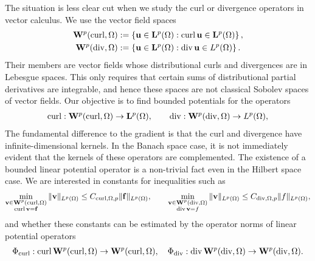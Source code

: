 \documentclass[12pt,a4paper]{article}
\begin{document}
The situation is less clear cut when we study the curl or divergence operators in vector calculus.
We use the vector field spaces
\begin{align*}
    {\mathbf W}^{p}(\operatorname{curl},\Omega) &:= \left\{ {\mathbf u} \in {\mathbf L}^p(\Omega) : \operatorname{curl} {\mathbf u} \in {\mathbf L}^p(\Omega) \right\}
    ,
    \\
    {\mathbf W}^{p}(\operatorname{div},\Omega) &:= \left\{ {\mathbf u} \in {\mathbf L}^p(\Omega) : \operatorname{div} {\mathbf u} \in L^p(\Omega) \right\}
    .
\end{align*}
Their members are vector fields whose distributional curls and divergences are in Lebesgue spaces. 
This only requires that certain sums of distributional partial derivatives are integrable, 
and hence these spaces are not classical Sobolev spaces of vector fields. 
Our objective is to find bounded potentials for the operators 
\begin{align*}
    \operatorname{curl} : {\mathbf W}^{p}(\operatorname{curl},\Omega) \rightarrow {\mathbf L}^{p}(\Omega),
    \qquad 
    \operatorname{div} : {\mathbf W}^{p}(\operatorname{div},\Omega) \rightarrow L^{p}(\Omega),
\end{align*}
The fundamental difference to the gradient is that the curl and divergence have infinite-dimensional kernels. 
In the Banach space case, it is not immediately evident that the kernels of these operators are complemented.
The existence of a bounded linear potential operator is a non-trivial fact even in the Hilbert space case.
We are interested in constants for inequalities such as 
\begin{align*}
    \min\limits_{ \substack{ {\mathbf v} \in {\mathbf W}^{p}(\operatorname{curl},\Omega) \\ \operatorname{curl} {\mathbf v} = {\mathbf f} } } 
    \| {\mathbf v} \|_{L^{p}(\Omega)}
    \leq 
    C_{\operatorname{curl},\Omega,p}
    \| {\mathbf f} \|_{L^{p}(\Omega)}
    ,
    \qquad 
    \min\limits_{ \substack{ {\mathbf v} \in {\mathbf W}^{p}(\operatorname{div},\Omega) \\ \operatorname{div} {\mathbf v} = f } } 
    \| {\mathbf v} \|_{L^{p}(\Omega)}
    \leq 
    C_{\operatorname{div},\Omega,p}
    \| f \|_{L^{p}(\Omega)}
    ,
\end{align*}
and whether these constants can be estimated by the operator norms of linear potential operators 
\begin{align*}
    \Phi_{\operatorname{curl}} : \operatorname{curl} {\mathbf W}^{p}(\operatorname{curl},\Omega) \rightarrow {\mathbf W}^{p}(\operatorname{curl},\Omega)
    ,
    \quad 
    \Phi_{\operatorname{div}} : \operatorname{div} {\mathbf W}^{p}(\operatorname{div},\Omega) \rightarrow {\mathbf W}^{p}(\operatorname{div},\Omega)
    .
\end{align*}
\end{document}
